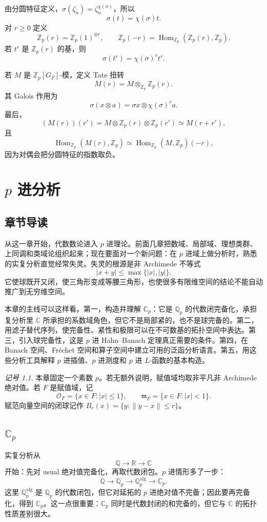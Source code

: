 \documentclass[11pt,a4paper,openany]{ctexbook}
\numberwithin{equation}{chapter}
\newcommand{\Q}{\mathbb{Q}}
\newcommand{\R}{\mathbb{R}}
\newcommand{\C}{\mathbb{C}}
\newcommand{\Z}{\mathbb{Z}}
\newcommand{\Hom}{\operatorname{Hom}}
\theoremstyle{plain}
\theoremstyle{definition}
\theoremstyle{remark}
\newtheorem{notation}[theorem]{记号}
\begin{document}
由分圆特征定义，$\sigma(\zeta_n)=\zeta_n^{\chi(\sigma)}$，所以
\[
\sigma(t)=\chi(\sigma)t.
\]
对 $r\geq0$ 定义
\[
\Z_p(r)=\Z_p(1)^{\otimes r},\qquad
\Z_p(-r)=\Hom_{\Z_p}(\Z_p(r),\Z_p).
\]
若 $t^r$ 是 $\Z_p(r)$ 的基，则
\[
\sigma(t^r)=\chi(\sigma)^r t^r.
\]

若 $M$ 是 $\Z_p[G_F]$-模，定义 Tate 扭转
\[
M(r)=M\otimes_{\Z_p}\Z_p(r).
\]
其 Galois 作用为
\[
\sigma(x\otimes a)=\sigma x\otimes \chi(\sigma)^r a.
\]
最后，
\[
(M(r))(r')=M\otimes \Z_p(r)\otimes \Z_p(r')\simeq M(r+r'),
\]
且
\[
\Hom_{\Z_p}(M(r),\Z_p)\simeq \Hom_{\Z_p}(M,\Z_p)(-r),
\]
因为对偶会把分圆特征的指数取负。
 \chapter{\texorpdfstring{$p$ 进分析}{p 进分析}}

\section{章节导读}

从这一章开始，代数数论进入 $p$ 进理论。前面几章把数域、局部域、理想类群、上同调和类域论组织起来；现在要面对一个新问题：在 $p$ 进域上做分析时，熟悉的实复分析直觉经常失灵。失灵的根源是非 Archimede 不等式
\[
  |x+y|\leq \max\{|x|,|y|\}.
\]
它使球既开又闭，使三角形变成等腰三角形，也使很多有限维空间的结论不能自动推广到无穷维空间。

本章的主线可以这样看。第一，构造并理解 $\C_p$：它是 $\Q_p$ 的代数闭完备化，承担复分析里 $\C$ 所承担的系数域角色，但它不是局部紧的，也不是球完备的。第二，用滤子替代序列，使完备性、紧性和极限可以在不可数基的拓扑空间中表达。第三，引入球完备性，这是 $p$ 进 Hahn--Banach 定理真正需要的条件。第四，在 Banach 空间、Fréchet 空间和算子空间中建立可用的泛函分析语言。第五，用这些分析工具解释 $p$ 进插值、$p$ 进测度和 $p$ 进 $L$-函数的基本构造。

\begin{notation}
本章固定一个素数 $p$。若无额外说明，赋值域均取非平凡非 Archimede 绝对值。若 $F$ 是赋值域，记
\[
  \mathcal O_F=\{x\in F: |x|\leq 1\},\qquad
  \mathfrak m_F=\{x\in F: |x|<1\}.
\]
赋范向量空间的闭球记作 $B_r(x)=\{y:\|y-x\|\le r\}$。
\end{notation}

\section{\texorpdfstring{$\C_p$}{Cp}}

实复分析从
\[
  \Q \longrightarrow \R \longrightarrow \C
\]
开始：先对 usual 绝对值完备化，再取代数闭包。$p$ 进情形多了一步：
\[
  \Q \longrightarrow \Q_p \longrightarrow \Q_p^{\mathrm{alg}}\longrightarrow \C_p.
\]
这里 $\Q_p^{\mathrm{alg}}$ 是 $\Q_p$ 的代数闭包，但它对延拓的 $p$ 进绝对值不完备；因此要再完备化，得到 $\C_p$。这一点很重要：$\C_p$ 同时是代数封闭的和完备的，但它与 $\C$ 的拓扑性质差别很大。
\end{document}
